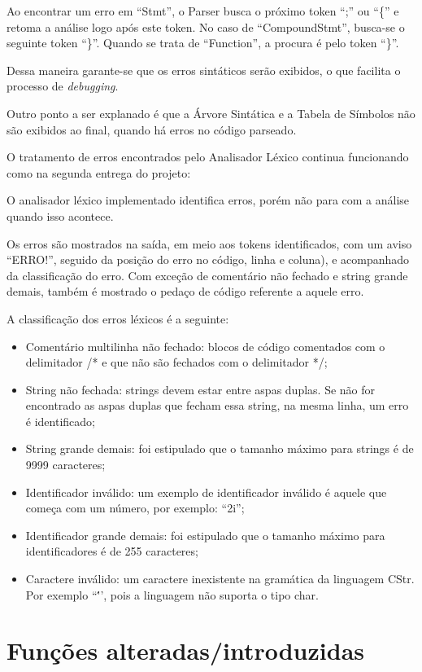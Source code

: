 \documentclass[12pt]{article}
\begin{document}
Ao encontrar um erro em ``Stmt'', o Parser busca o próximo token ``;'' ou ``\{'' e retoma a análise logo após este token. No caso de ``CompoundStmt'', busca-se o seguinte token ``\}''. Quando se trata de ``Function'', a procura é pelo token ``\}''.

Dessa maneira garante-se que os erros sintáticos serão exibidos, o que facilita o processo de \textit{debugging}.

Outro ponto a ser explanado é que a Árvore Sintática e a Tabela de Símbolos não são exibidos ao final, quando há erros no código parseado.

O tratamento de erros encontrados pelo Analisador Léxico continua funcionando como na segunda entrega do projeto:

O analisador léxico implementado identifica erros, porém não para com a análise quando isso acontece.

Os erros são mostrados na saída, em meio aos tokens identificados, com um aviso ``ERRO!'', seguido da posição do erro no código, linha e coluna), e acompanhado da classificação do erro. Com exceção de comentário não fechado e string grande demais, também é mostrado o pedaço de código referente a aquele erro.

A classificação dos erros léxicos é a seguinte:
\begin{itemize}
	\item Comentário multilinha não fechado: blocos de código comentados com o delimitador /* e que não são fechados com o delimitador */;
	\item String não fechada: strings devem estar entre aspas duplas. Se não for encontrado as aspas duplas que fecham essa string, na mesma linha, um erro é identificado;
	\item String grande demais: foi estipulado que o tamanho máximo para strings é de 9999 caracteres;
	\item Identificador inválido: um exemplo de identificador inválido é aquele que começa com um número, por exemplo: ``2i'';
	\item Identificador grande demais: foi estipulado que o tamanho máximo para identificadores é de 255 caracteres;
	\item Caractere inválido: um caractere inexistente na gramática da linguagem CStr. Por exemplo ``\''', pois a linguagem não suporta o tipo char.\\
\end{itemize}

\section{Funções alteradas/introduzidas}
\end{document}
